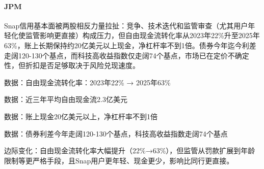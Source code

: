 \documentclass[11pt]{ctexart}
\begin{document}
\paragraph{JPM} Snap信用基本面被两股相反力量拉扯：竞争、技术迭代和监管审查（尤其用户年轻化使监管影响更直接）构成压力，但自由现金流转化率从2023年22\%升至2025年63\%，账上长期保持约20亿美元以上现金，净杠杆率不到1倍。债券今年迄今利差走阔120-130个基点，而科技高收益指数仅走阔74个基点，市场已在定价不确定性，但折扣是否足够取决于风险兑现速度。
{\small\color{refgray}数据：自由现金流转化率：2023年22\% → 2025年63\%\par}
{\small\color{refgray}数据：近三年平均自由现金流2.3亿美元\par}
{\small\color{refgray}数据：账上现金20亿美元以上，净杠杆率不到1倍\par}
{\small\color{refgray}数据：债券利差今年走阔120-130个基点，科技高收益指数走阔74个基点\par}
{\small\color{refgray}边际变化：自由现金流转化率大幅提升（22\%→63\%），但监管从罚款扩展到年龄限制等更严格手段，且Snap用户更年轻、现金更少，影响比同行更直接。\par}
\end{document}
